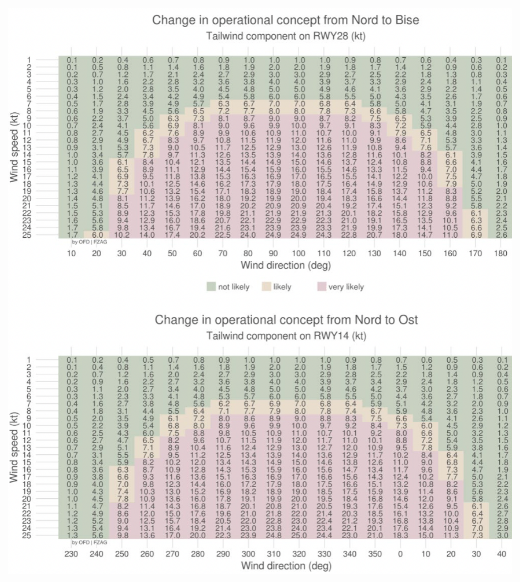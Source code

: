 \documentclass[9pt, landscape, fleqn]{scrartcl}
\begin{document}
\begin{multicols*}{3}
\begin{center}
\includegraphics[width=15cm]{Images/Tailwind.png}
\end{center}
\newpage

\end{multicols*}
\end{document}
